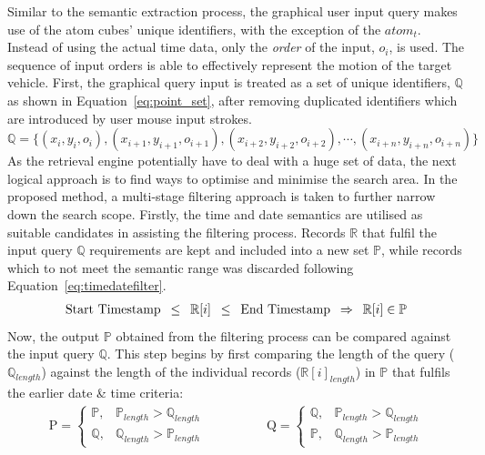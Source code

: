 Similar to the semantic extraction process, the graphical user input query makes use of the atom cubes' unique identifiers, with the exception of the $atom_t$. 
Instead of using the actual time data, only the \emph{order} of the input, $o_{i}$, is used. The sequence of input orders is able to effectively represent the motion of the target vehicle. First, the graphical query input is treated as a set of unique identifiers, $\mathbb{Q}$ as shown in Equation~\ref{eq:point_set}, after removing duplicated identifiers which are introduced by user mouse input strokes.
\begin{equation}
\label{eq:point_set}
    \mathbb{Q} = \{ (x_i, y_i, o_i), (x_{i+1}, y_{i+1}, o_{i+1}), (x_{i+2}, y_{i+2}, o_{i+2}), \dotsb,(x_{i+n}, y_{i+n}, o_{i+n})\}
\end{equation}
As the retrieval engine potentially have to deal with a huge set of data, the next logical approach is to find ways to optimise and minimise the search area. In the proposed method, a multi-stage filtering approach is taken to further narrow down the search scope.
Firstly, the time and date semantics are utilised as suitable candidates in assisting the filtering process.
Records $\mathbb{R}$ that fulfil the input query $\mathbb{Q}$ requirements are kept and
included into a new set $\mathbb{P}$, while records which to not meet the semantic range was discarded following Equation~\ref{eq:timedatefilter}.
\begin{gather}
\label{eq:timedatefilter}
  \text{Start Timestamp} \hspace{.5em} \leq \hspace{.5em} \mathbb{R}[i] \hspace{.5em} \leq \hspace{.5em} \text{End Timestamp} \hspace{.5em} \Rightarrow \hspace{.5em} \mathbb{R}[i] \in \mathbb{P}
\end{gather}
Now, the output $\mathbb{P}$ obtained from the filtering process can be compared against the input query $\mathbb{Q}$. This step begins by first comparing the length of the query ($\mathbb{Q}_{length}$) against the length
of the individual records ($\mathbb{R}[i]_{length}$) in $\mathbb{P}$ that
fulfils the earlier date \& time criteria:
\begin{align}
\mathrm{P} =\begin{cases}
\mathbb{P}, & \mathbb{P}_{length} > \mathbb{Q}_{length} \\
\mathbb{Q}, & \mathbb{Q}_{length} > \mathbb{P}_{length}
\end{cases}   \hspace{2em}  &  \hspace{2em}
\mathrm{Q} =\begin{cases}
\mathbb{Q}, & \mathbb{P}_{length} > \mathbb{Q}_{length} \\
\mathbb{P}, & \mathbb{Q}_{length} > \mathbb{P}_{length}
\end{cases}
\end{align}
